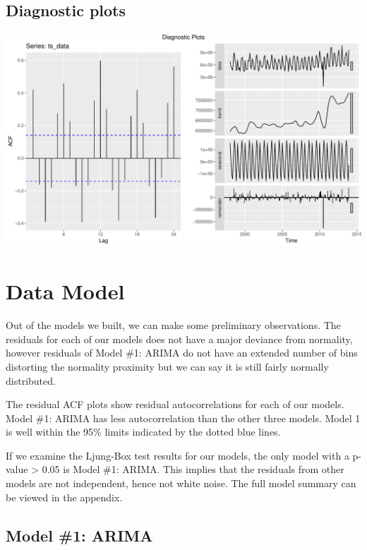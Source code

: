 \documentclass[openany]{book}
\begin{document}
\hypertarget{diagnostic-plots}{%
\subsection{Diagnostic plots}\label{diagnostic-plots}}

\includegraphics{Part-B-AS_files/figure-latex/unnamed-chunk-3-1.pdf}

\hypertarget{b-model}{%
\section*{Data Model}\label{b-model}}

Out of the models we built, we can make some preliminary observations.
The residuals for each of our models does not have a major deviance from
normality, however residuals of Model \#1: ARIMA do not have an extended
number of bins distorting the normality proximity but we can say it is
still fairly normally distributed.

The residual ACF plots show residual autocorrelations for each of our
models. Model \#1: ARIMA has less autocorrelation than the other three
models. Model 1 is well within the 95\% limits indicated by the dotted
blue lines.

If we examine the Ljung-Box test results for our models, the only model
with a p-value \textgreater{} 0.05 is Model \#1: ARIMA. This implies
that the residuals from other models are not independent, hence not
white noise. The full model summary can be viewed in the appendix.

\hypertarget{model-1-arima}{%
\subsection{Model \#1: ARIMA}\label{model-1-arima}}
\end{document}
